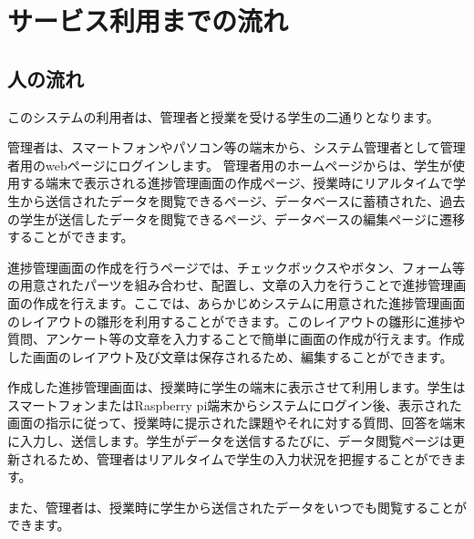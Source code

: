 \documentclass[a4j,titlepage]{ujarticle}
\begin{document}
\section{サービス利用までの流れ}
\subsection{人の流れ}
このシステムの利用者は、管理者と授業を受ける学生の二通りとなります。

管理者は、スマートフォンやパソコン等の端末から、システム管理者として管理者用のwebページにログインします。
管理者用のホームページからは、学生が使用する端末で表示される進捗管理画面の作成ページ、授業時にリアルタイムで学生から送信されたデータを閲覧できるページ、データベースに蓄積された、過去の学生が送信したデータを閲覧できるページ、データベースの編集ページに遷移することができます。

進捗管理画面の作成を行うページでは、チェックボックスやボタン、フォーム等の用意されたパーツを組み合わせ、配置し、文章の入力を行うことで進捗管理画面の作成を行えます。ここでは、あらかじめシステムに用意された進捗管理画面のレイアウトの雛形を利用することができます。このレイアウトの雛形に進捗や質問、アンケート等の文章を入力することで簡単に画面の作成が行えます。作成した画面のレイアウト及び文章は保存されるため、編集することができます。

作成した進捗管理画面は、授業時に学生の端末に表示させて利用します。学生はスマートフォンまたはRaspberry pi端末からシステムにログイン後、表示された画面の指示に従って、授業時に提示された課題やそれに対する質問、回答を端末に入力し、送信します。学生がデータを送信するたびに、データ閲覧ページは更新されるため、管理者はリアルタイムで学生の入力状況を把握することができます。

また、管理者は、授業時に学生から送信されたデータをいつでも閲覧することができます。


\end{document}
